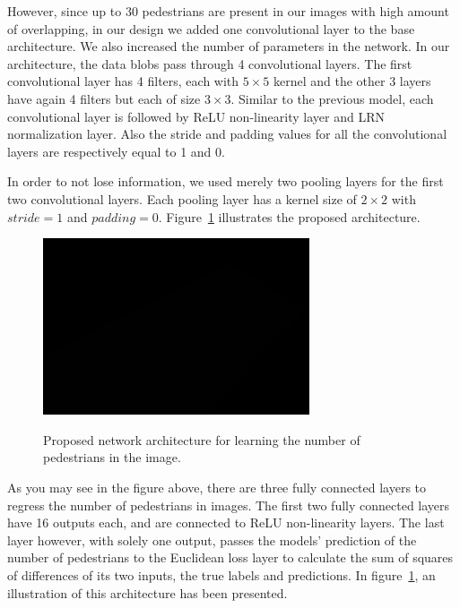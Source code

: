 \noindent However, since up to 30 pedestrians are present in our images with high amount of overlapping, in our design we added one convolutional layer to the base architecture. We also increased the number of parameters in the network. In our architecture, the data blobs pass through 4 convolutional layers. The first convolutional layer has 4 filters, each with $5\times5$ kernel and the other 3 layers have again 4 filters but each of size $3\times3$. Similar to the previous model, each convolutional layer is followed by ReLU non-linearity layer and LRN normalization layer. Also the stride and padding values for all the convolutional layers are respectively equal to 1 and 0. 

\indent In order to not lose information, we used merely two pooling layers for the first two convolutional layers. Each pooling layer has a kernel size of $2\times2$ with $stride = 1$  and $padding = 0$. Figure~\ref{fig:ucsdnet} illustrates the proposed architecture. 

\begin{figure}[H]
  \centering
   {\includegraphics[width=0.7\textwidth]{images/1}}
	\caption{Proposed network architecture for learning the number of pedestrians in the image.}
	\label{fig:ucsdnet}
\end{figure}

As you may see in the figure above, there are three fully connected layers to regress the number of pedestrians in images. The first two fully connected layers have 16 outputs each, and are connected to ReLU non-linearity layers. The last layer however, with solely one output, passes the models' prediction of the number of pedestrians to the Euclidean loss layer to calculate the sum of squares of differences of its two inputs, the true labels and predictions. In figure~\ref{fig:ucsdnet}, an illustration of this architecture has been presented.

